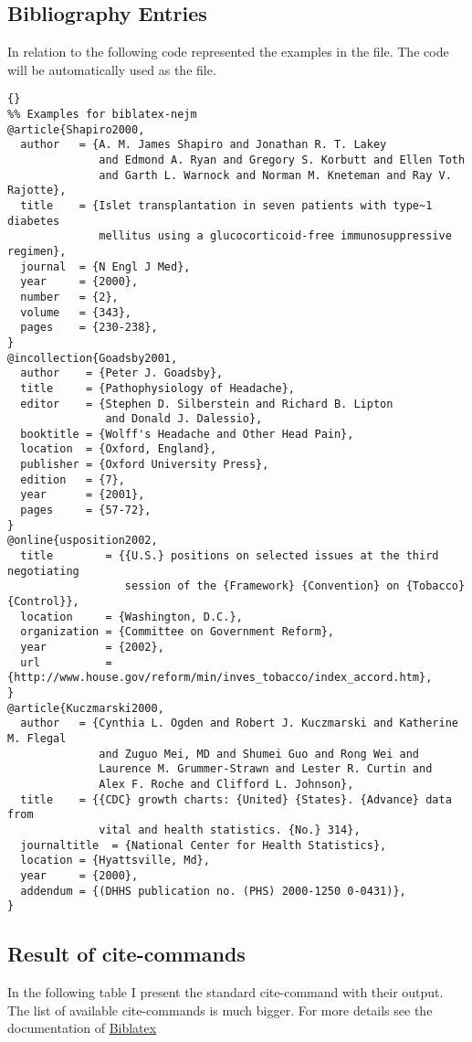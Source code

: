 \documentclass[english]{ltxdockit}
\newcommand*{\biblatex}{Biblatex\xspace}
\newcommand*{\biblatexctan}{http://www.ctan.org/tex-archive/macros/latex/contrib/biblatex/}
\begin{document}
\subsection{Bibliography Entries}
In relation to  the following code represented the examples in the  file. The code will be automatically used as the  file.
\begin{lstlisting}[style=bibtex]{}
%% Examples for biblatex-nejm
@article{Shapiro2000,
  author   = {A. M. James Shapiro and Jonathan R. T. Lakey
              and Edmond A. Ryan and Gregory S. Korbutt and Ellen Toth
              and Garth L. Warnock and Norman M. Kneteman and Ray V. Rajotte},
  title    = {Islet transplantation in seven patients with type~1 diabetes
              mellitus using a glucocorticoid-free immunosuppressive regimen},
  journal  = {N Engl J Med},
  year     = {2000},
  number   = {2},
  volume   = {343},
  pages    = {230-238},
}
@incollection{Goadsby2001,
  author    = {Peter J. Goadsby},
  title     = {Pathophysiology of Headache},
  editor    = {Stephen D. Silberstein and Richard B. Lipton
               and Donald J. Dalessio},
  booktitle = {Wolff's Headache and Other Head Pain},
  location  = {Oxford, England},
  publisher = {Oxford University Press},
  edition   = {7},
  year      = {2001},
  pages     = {57-72},
}
@online{usposition2002,
  title        = {{U.S.} positions on selected issues at the third negotiating
                  session of the {Framework} {Convention} on {Tobacco} {Control}},
  location     = {Washington, D.C.},
  organization = {Committee on Government Reform},
  year         = {2002},
  url          = {http://www.house.gov/reform/min/inves_tobacco/index_accord.htm},
}
@article{Kuczmarski2000,
  author   = {Cynthia L. Ogden and Robert J. Kuczmarski and Katherine M. Flegal
              and Zuguo Mei, MD and Shumei Guo and Rong Wei and
              Laurence M. Grummer-Strawn and Lester R. Curtin and
              Alex F. Roche and Clifford L. Johnson},
  title    = {{CDC} growth charts: {United} {States}. {Advance} data from
              vital and health statistics. {No.} 314},
  journaltitle  = {National Center for Health Statistics},
  location = {Hyattsville, Md},
  year     = {2000},
  addendum = {(DHHS publication no. (PHS) 2000-1250 0-0431)},
}
\end{lstlisting}
\clearpage
\subsection{Result of cite-commands}
In the following table I present the standard cite-command with their output. The list of available cite-commands is much bigger. For more details see the documentation of \href{\biblatexctan}{\biblatex}
\end{document}
